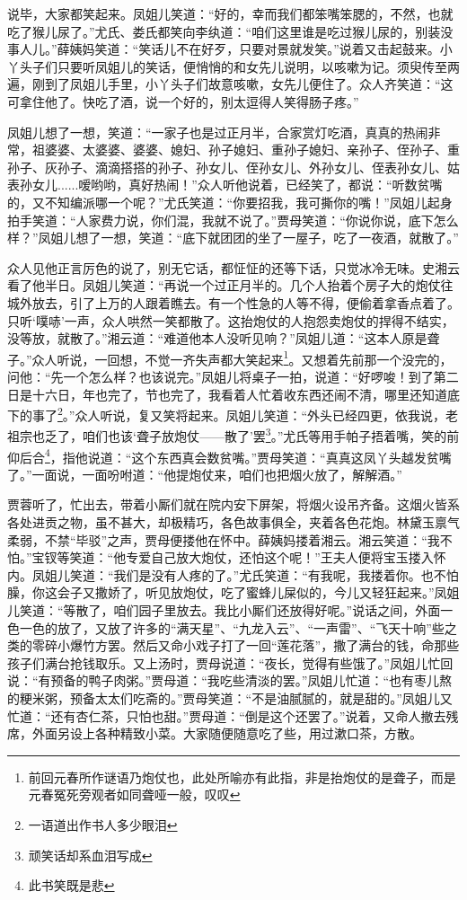 \documentclass[12pt,oneside]{book}
\begin{document}
说毕，大家都笑起来。凤姐儿笑道：“好的，幸而我们都笨嘴笨腮的，不然，也就吃了猴儿尿了。”尤氏、娄氏都笑向李纨道：“咱们这里谁是吃过猴儿尿的，别装没事人儿。”薛姨妈笑道：“笑话儿不在好歹，只要对景就发笑。”说着又击起鼓来。小丫头子们只要听凤姐儿的笑话，便悄悄的和女先儿说明，以咳嗽为记。须臾传至两遍，刚到了凤姐儿手里，小丫头子们故意咳嗽，女先儿便住了。众人齐笑道：“这可拿住他了。快吃了酒，说一个好的，别太逗得人笑得肠子疼。”

凤姐儿想了一想，笑道：“一家子也是过正月半，合家赏灯吃酒，真真的热闹非常，祖婆婆、太婆婆、婆婆、媳妇、孙子媳妇、重孙子媳妇、亲孙子、侄孙子、重孙子、灰孙子、滴滴搭搭的孙子、孙女儿、侄孙女儿、外孙女儿、侄表孙女儿、姑表孙女儿......嗳哟哟，真好热闹！”众人听他说着，已经笑了，都说：“听数贫嘴的，又不知编派哪一个呢？”尤氏笑道：“你要招我，我可撕你的嘴！”凤姐儿起身拍手笑道：“人家费力说，你们混，我就不说了。”贾母笑道：“你说你说，底下怎么样？”凤姐儿想了一想，笑道：“底下就团团的坐了一屋子，吃了一夜酒，就散了。”

众人见他正言厉色的说了，别无它话，都怔怔的还等下话，只觉冰冷无味。史湘云看了他半日。凤姐儿笑道：“再说一个过正月半的。几个人抬着个房子大的炮仗往城外放去，引了上万的人跟着瞧去。有一个性急的人等不得，便偷着拿香点着了。只听‘噗哧’一声，众人哄然一笑都散了。这抬炮仗的人抱怨卖炮仗的捍得不结实，没等放，就散了。”湘云道：“难道他本人没听见响？”凤姐儿道：“这本人原是聋子。”众人听说，一回想，不觉一齐失声都大笑起来\footnote{前回元春所作谜语乃炮仗也，此处所喻亦有此指，非是抬炮仗的是聋子，而是元春冤死旁观者如同聋哑一般，叹叹}。又想着先前那一个没完的，问他：“先一个怎么样？也该说完。”凤姐儿将桌子一拍，说道：“好啰唆！到了第二日是十六日，年也完了，节也完了，我看着人忙着收东西还闹不清，哪里还知道底下的事了\footnote{一语道出作书人多少眼泪}。”众人听说，复又笑将起来。凤姐儿笑道：“外头已经四更，依我说，老祖宗也乏了，咱们也该‘聋子放炮仗——散了’罢\footnote{顽笑话却系血泪写成}。”尤氏等用手帕子捂着嘴，笑的前仰后合\footnote{此书笑既是悲}，指他说道：“这个东西真会数贫嘴。”贾母笑道：“真真这凤丫头越发贫嘴了。”一面说，一面吩咐道：“他提炮仗来，咱们也把烟火放了，解解酒。”

贾蓉听了，忙出去，带着小厮们就在院内安下屏架，将烟火设吊齐备。这烟火皆系各处进贡之物，虽不甚大，却极精巧，各色故事俱全，夹着各色花炮。林黛玉禀气柔弱，不禁“毕驳”之声，贾母便搂他在怀中。薛姨妈搂着湘云。湘云笑道：“我不怕。”宝钗等笑道：“他专爱自己放大炮仗，还怕这个呢！”王夫人便将宝玉搂入怀内。凤姐儿笑道：“我们是没有人疼的了。”尤氏笑道：“有我呢，我搂着你。也不怕臊，你这会子又撒娇了，听见放炮仗，吃了蜜蜂儿屎似的，今儿又轻狂起来。”凤姐儿笑道：“等散了，咱们园子里放去。我比小厮们还放得好呢。”说话之间，外面一色一色的放了，又放了许多的“满天星”、“九龙入云”、“一声雷”、“飞天十响”些之类的零碎小爆竹方罢。然后又命小戏子打了一回“莲花落”，撒了满台的钱，命那些孩子们满台抢钱取乐。又上汤时，贾母说道：“夜长，觉得有些饿了。”凤姐儿忙回说：“有预备的鸭子肉粥。”贾母道：“我吃些清淡的罢。”凤姐儿忙道：“也有枣儿熬的粳米粥，预备太太们吃斋的。”贾母笑道：“不是油腻腻的，就是甜的。”凤姐儿又忙道：“还有杏仁茶，只怕也甜。”贾母道：“倒是这个还罢了。”说着，又命人撤去残席，外面另设上各种精致小菜。大家随便随意吃了些，用过漱口茶，方散。
\end{document}
